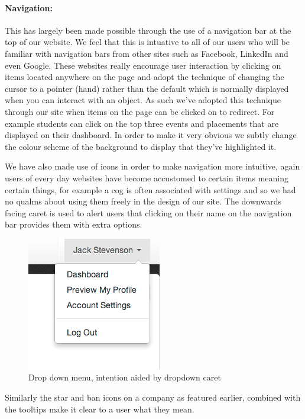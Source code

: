     \paragraph{Navigation:} This has largely been made possible through the use of a navigation bar at the top of our website. We feel that this is intuative to all of our users who will be familiar with navigation bars from other sites such as Facebook\cite{facebook}, LinkedIn\cite{linkedin} and even Google\cite{google}. These websites really encourage user interaction by clicking on items located anywhere on the page and adopt the technique of changing the cursor to a pointer (hand) rather than the default which is normally displayed when you can interact with an object. As such we've adopted this technique through our site when items on the page can be clicked on to redirect. For example students can click on the top three events and placements that are displayed on their dashboard. In order to make it very obvious we subtly change the colour scheme of the background to display that they've highlighted it.

    We have also made use of icons in order to make navigation more intuitive, again users of every day websites have become accustomed to certain items meaning certain things, for example a cog is often associated with settings and so we had no qualms about using them freely in the design of our site.
    The downwards facing caret is used to alert users that clicking on their name on the navigation bar provides them with extra options.
    
    \begin{figure}[H]\centering
    \includegraphics[scale=0.5]{images/design/navigation_caret}
    \caption{Drop down menu, intention aided by dropdown caret}
    \end{figure}

    Similarly the star and ban icons on a company as featured earlier, combined with the tooltips make it clear to a user what they mean.

